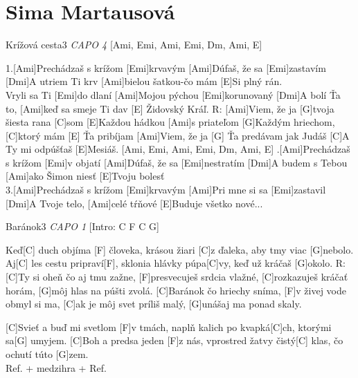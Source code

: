 \documentclass[12pt]{article}
\begin{document}
\newpage
\section{Sima Martausová}

\begin{song}{Krížová cesta}{3}
	\textit{CAPO 4}
	[Ami, Emi, Ami, Emi, Dm, Ami, E]
	
	1.[Ami]Prechádzaš s krížom [Emi]krvavým
	[Ami]Dúfaš, že sa [Emi]zastavím
	[Dmi]A utriem Ti krv [Ami]bielou šatkou-čo mám
	[E]Si plný rán.
	\\
	[Ami]Vryli sa Ti [Emi]do dlaní
	[Ami]Mojou pýchou [Emi]korunovaný
	[Dmi]A bolí Ťa to, [Ami]keď sa smeje Ti dav
	[E] Židovský Kráľ.
	\columnbreak
	R: [Ami]Viem, že ja [G]tvoja šiesta rana [C]som
	[E]Každou hádkou [Ami]s priateľom
	[G]Každým hriechom, [C]ktorý mám
	[E] Ťa pribíjam
	[Ami]Viem, že ja [G] Ťa predávam jak Judáš
	[C]A Ty mi odpúšťaš [E]Mesiáš.
	[Ami, Emi, Ami, Emi, Dm, Ami, E]
	.[Ami]Prechádzaš s krížom [Emi]v objatí
	[Ami]Dúfaš, že sa [Emi]nestratím
	[Dmi]A budem s Tebou [Ami]ako Šimon niesť
	[E]Tvoju bolesť
	\\
	3.[Ami]Prechádzaš s krížom [Emi]krvavým
	[Ami]Pri mne si sa [Emi]zastavil
	[Dmi]A Tvoje telo, [Ami]celé tŕňové
	[E]Buduje všetko nové...
\end{song}

\begin{song}{Baránok}{3}
	\textit{CAPO 1}
	[Intro: C F C G]
	
	Keď[C] duch objíma [F] človeka,
	krásou žiari [C]z ďaleka,
	aby tmy viac [G]nebolo.
	Aj[C] les cestu pripraví[F],
	sklonia hlávky púpa[C]vy,
	keď už kráčaš [G]okolo.
	\columnbreak
	R: [C]Ty si oheň čo aj tmu zažne,
	[F]presvecuješ srdcia vlažné,
	[C]rozkazuješ kráčať horám,
	[G]môj hlas na púšti zvolá.
	[C]Baránok čo hriechy sníma,
	[F]v živej vode obmyl si ma,
	[C]ak je môj svet príliš malý,
	[G]unášaj ma ponad skaly.
	\columnbreak
	[Medzihra (2x): C F C G]
	
	[C]Svieť a buď mi svetlom [F]v tmách,
	naplň kalich po kvapká[C]ch,
	ktorými sa[G] umyjem.
	[C]Boh a predsa jeden [F]z nás,
	vprostred žatvy čistý[C] klas,
	čo ochutí túto [G]zem.
	\\
	Ref. + medzihra + Ref.
\end{song}
\end{document}
